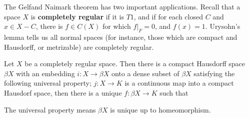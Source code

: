 The Gelfand Naimark theorem has two important applications. Recall that a space $X$ is {\bf completely regular} if it is $T1$, and if for each closed $C$ and $x \in X - C$, there is $f \in C(X)$ for which $f|_F = 0$, and $f(x) = 1$. Urysohn's lemma tells us all normal spaces (for instance, those which are compact and Hausdorff, or metrizable) are completely regular.

\begin{theorem}
    Let $X$ be a completely regular space. Then there is a compact Hausdorff space $\beta X$ with an embedding $i: X \to \beta X$ onto a dense subset of $\beta X$ satisfying the following universal property; $j: X \to K$ is a continuous map into a compact Hausdorf space, then there is a unique $f: \beta X \to K$ such that
    \begin{center}
    \end{center}
    The universal property means $\beta X$ is unique up to homeomorphism.
\end{theorem}
